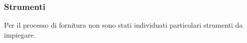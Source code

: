 %					
%				 
%
%			
\subsubsection{Strumenti}
		Per il processo di fornitura non sono stati individuati particolari strumenti da impiegare.